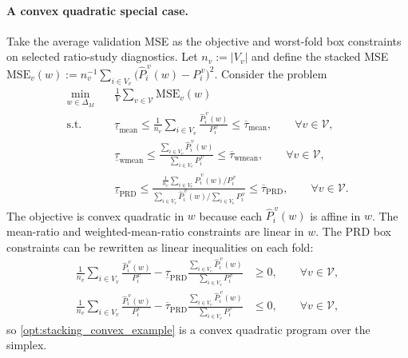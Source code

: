 \documentclass{article}
\theoremstyle{plain}
\theoremstyle{definition}
\newcommand{\1}{\mathbf{1}}
\begin{document}
\paragraph{A convex quadratic special case.}
Take the average validation MSE as the objective and worst-fold box constraints on selected ratio-study diagnostics. Let $n_v:=|V_v|$ and define the stacked MSE
$
\mathrm{MSE}_v(w)
:=
n_v^{-1}\sum_{i\in V_v}
\bigl(\hat P_i^{\,v}(w)-P_i^{\,v}\bigr)^2.
$
Consider the problem
\begin{align}
    \label{opt:stacking_convex_example}
    \min_{w\in\Delta_M}
    \quad
    & \frac{1}{V}\sum_{v\in\mathcal V}\mathrm{MSE}_v(w)
    \\
    \text{s.t.}\quad
    & \underline{\tau}_{\mathrm{mean}}
      \le
      \frac{1}{n_v}\sum_{i\in V_v}\frac{\hat P_i^{\,v}(w)}{P_i^{\,v}}
      \le
      \overline{\tau}_{\mathrm{mean}},
      \qquad \forall v\in\mathcal V,
      \nonumber\\
    & \underline{\tau}_{\mathrm{wmean}}
      \le
      \frac{\sum_{i\in V_v}\hat P_i^{\,v}(w)}{\sum_{i\in V_v}P_i^{\,v}}
      \le
      \overline{\tau}_{\mathrm{wmean}},
      \qquad \forall v\in\mathcal V,
      \nonumber\\
    & \underline{\tau}_{\mathrm{PRD}}
      \le
      \frac{
        \frac{1}{n_v}\sum_{i\in V_v}\hat P_i^{\,v}(w)/P_i^{\,v}
      }{
        \sum_{i\in V_v}\hat P_i^{\,v}(w)\big/\sum_{i\in V_v}P_i^{\,v}
      }
      \le
      \overline{\tau}_{\mathrm{PRD}},
      \qquad \forall v\in\mathcal V.
      \nonumber
\end{align}
The objective is convex quadratic in $w$ because each $\hat P_i^{\,v}(w)$ is affine in $w$. The mean-ratio and weighted-mean-ratio constraints are linear in $w$. The PRD box constraints can be rewritten as linear inequalities on each fold:
\begin{align}
    \label{eq:prd_linearized_bounds}
    \frac{1}{n_v}\sum_{i\in V_v}\frac{\hat P_i^{\,v}(w)}{P_i^{\,v}}
    -
    \underline{\tau}_{\mathrm{PRD}}
    \frac{\sum_{i\in V_v}\hat P_i^{\,v}(w)}{\sum_{i\in V_v}P_i^{\,v}}
    &\ge 0,
    \qquad \forall v\in\mathcal V,
    \\
    \frac{1}{n_v}\sum_{i\in V_v}\frac{\hat P_i^{\,v}(w)}{P_i^{\,v}}
    -
    \overline{\tau}_{\mathrm{PRD}}
    \frac{\sum_{i\in V_v}\hat P_i^{\,v}(w)}{\sum_{i\in V_v}P_i^{\,v}}
    &\le 0,
    \qquad \forall v\in\mathcal V,
    \nonumber
\end{align}
so \eqref{opt:stacking_convex_example} is a convex quadratic program over the simplex.
\end{document}
